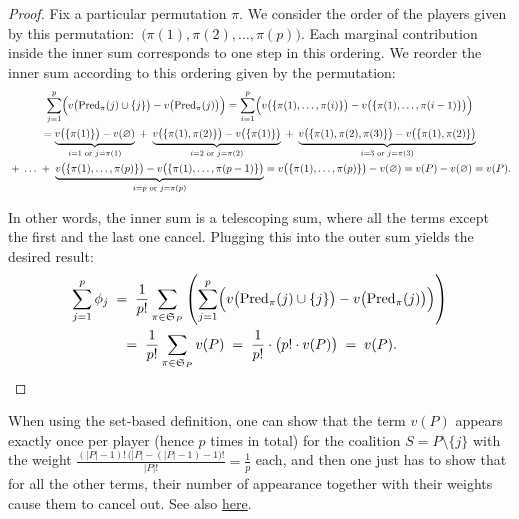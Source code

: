 {\begin{enumerate}
\begin{proof}
        Fix a particular permutation $\pi$. 
        We consider the order of the players given by this permutation:~$\bigl(\pi(1), \pi(2), \dots, \pi(p)\bigr)$.
        Each marginal contribution inside the inner sum corresponds to one step in this ordering.
        We reorder the inner sum according to this ordering given by the permutation:
        \begin{multline*}
            \sum_{j=1}^p \Bigl( v\bigl( \mathrm{Pred}_\pi(j) \cup \{j\} \bigr)
                - v\bigl( \mathrm{Pred}_\pi(j) \bigr) \Bigr)
            = \sum_{i=1}^p \Bigl( v\bigl( \{ \pi(1), \dots, \pi(i) \} \bigr)
                - v\bigl( \{ \pi(1), \dots, \pi(i-1) \} \bigr) \Bigr) \\
            = \underbrace{v \bigl( \{ \pi(1) \} \bigr) - v(\varnothing)}_{i=1 \text{ or } j = \pi(1)}
                \;+\; \underbrace{v \bigl( \{ \pi(1), \pi(2) \} \bigr) - v \bigl( \{ \pi(1) \} \bigr)}_{i=2 \text{ or } j = \pi(2)}
                \;+\; \underbrace{v \bigl( \{ \pi(1), \pi(2), \pi(3) \} \bigr) - v \bigl( \{ \pi(1), \pi(2) \} \bigr)}_{i=3 \text{ or } j = \pi(3)} \\
                \;+\; \dots 
                \;+\; \underbrace{v \bigl( \{ \pi(1), \ldots, \pi(p) \} \bigr) - v \bigl( \{ \pi(1), \ldots, \pi(p - 1) \} \bigr)}_{i=p \text{ or } j = \pi(p)} 
            = v \bigl( \{ \pi(1), \ldots, \pi(p) \} \bigr) - v(\varnothing)
            = v(P) - v(\varnothing) = v (P).
        \end{multline*}

        In other words, the inner sum is a telescoping sum, where all the terms except the first and the last one cancel.
        Plugging this into the outer sum yields the desired result:
        \begin{gather*}
            \sum_{j=1}^p \phi_j 
            \;=\; \frac{1}{p!} \sum_{\pi \in \mathfrak{S}_P} \left( \sum_{j=1}^p \Bigl(
                v\bigl( \mathrm{Pred}_\pi(j) \cup \{j\} \bigr)
                - v\bigl( \mathrm{Pred}_\pi(j) \bigr)
            \Bigr) \right) \\
            \;=\; \frac{1}{p!} \sum_{\pi \in \mathfrak{S}_P} v(P)
            \;=\; \frac{1}{p!} \cdot \bigl(p! \cdot v(P)\bigr)
            \;=\; v(P) .
        \end{gather*}
        
    \end{proof}

    When using the set-based definition, one can show that the term $v(P)$ appears exactly once per player (hence $p$ times in total) for the coalition $S = P \setminus \{j\}$ with the weight $\frac{(|P| - 1)! \, \bigl(|P| - (|P| - 1) - 1\bigr)!}{|P|!} = \frac{1}{p}$ each, and then one just has to show that for all the other terms, their number of appearance together with their weights cause them to cancel out.
    See also \href{https://math.stackexchange.com/questions/2747088/shapley-value-is-efficient}{here}.


\end{enumerate}}
